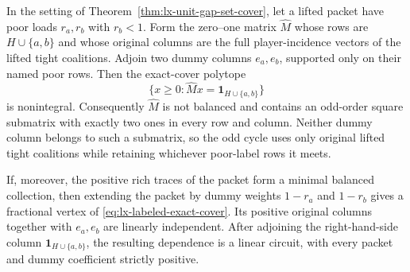 \begin{theorem}
\label{thm:lx-labeled-odd-cycle}
In the setting of Theorem~\ref{thm:lx-unit-gap-set-cover}, let a lifted
packet have poor loads $r_a,r_b$ with $r_b<1$.  Form the zero--one matrix
$\widehat M$ whose rows are $H\cup\{a,b\}$ and whose original columns are
the full player-incidence vectors of the lifted tight coalitions.  Adjoin
two dummy columns $e_a,e_b$, supported only on their named poor rows.
Then the exact-cover polytope
\[
 \{x\geq0:\widehat Mx=\mathbf1_{H\cup\{a,b\}}\}   \tag{LO-1}
 \label{eq:lx-labeled-exact-cover}
\]
is nonintegral.  Consequently $\widehat M$ is not balanced and contains an
odd-order square submatrix with exactly two ones in every row and column.
Neither dummy column belongs to such a submatrix, so the odd cycle uses only
original lifted tight coalitions while retaining whichever poor-label rows
it meets.

If, moreover, the positive rich traces of the packet form a minimal balanced
collection, then extending the packet by dummy weights $1-r_a$ and $1-r_b$
gives a fractional vertex of \eqref{eq:lx-labeled-exact-cover}.  Its positive
original columns together with $e_a,e_b$ are linearly independent.  After
adjoining the right-hand-side column $\mathbf1_{H\cup\{a,b\}}$, the resulting
dependence is a linear circuit, with every packet and dummy coefficient
strictly positive.
\end{theorem}

